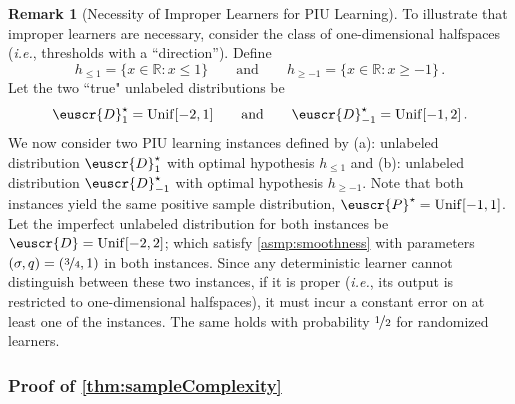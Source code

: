 \documentclass[11pt]{article}
\theoremstyle{plain}
\theoremstyle{definition}
\newtheorem{remark}[theorem]{Remark}
\theoremstyle{remark}
\newcommand{\qquadtext}[1]{\qquad\text{#1}\qquad}
\newcommand{\qquadand}{\qquadtext{and}}
\newcommand{\R}{\mathbb{R}}
\newcommand{\nfrac}[2]{\nicefrac{#1}{#2}}
\newcommand{\unif}{{\rm Unif}}
\newcommand{\customcal}[1]{\euscr{#1}}
\newcommand{\cD}{\customcal{D}}
\newcommand{\cP}{\customcal{P}}
\newcommand{\ie}{\textit{i.e.}}
\newcommand{\cDtrue}{\cD^\star}
\newcommand{\cDgiven}{\cD}
\newcommand{\cPtrue}{\cP^\star}
\begin{document}
    \begin{remark}[Necessity of Improper Learners for PIU Learning]
        \label{rem:necessityOfImproper}
    To illustrate that improper learners are necessary, consider the class of one-dimensional halfspaces (\ie{}, thresholds with a ``direction''). Define
        \[
        h_{\leq 1} = \{ x \in \R : x \leq 1 \} \qquadand h_{\geq -1} = \{ x \in \R : x \geq -1 \}\,.
        \]
        Let the two ``true" unlabeled distributions be 
        \[
            \cDtrue_1 = \unif[-2,1] \qquadand \cDtrue_{-1} = \unif[-1,2]\,.
        \]
        We now consider two PIU learning instances defined by (a): unlabeled distribution $\cDtrue_1$ with optimal hypothesis $h_{\leq 1}$ and (b): unlabeled distribution $\cDtrue_{-1}$ with optimal hypothesis $h_{\geq -1}$.
        Note that both instances yield the same positive sample distribution, $\cPtrue = \unif[-1,1]$.
        Let the imperfect unlabeled distribution for both instances be $\cDgiven = \unif[-2,2]$; which satisfy \cref{asmp:smoothness} with parameters $(\sigma,q)=(\nfrac{3}{4},1)$ in both instances.
        Since any deterministic learner cannot distinguish between these two instances, if it is proper (\ie{}, its output is restricted to one-dimensional halfspaces), it must incur a constant error on at least one of the instances. The same holds with probability $\nfrac{1}{2}$ for randomized learners.
    \end{remark}
    \subsubsection{Proof of \cref{thm:sampleComplexity}}
        
\end{document}
